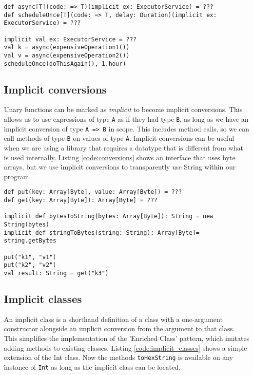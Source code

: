 \begin{lstlisting}[caption=Code with implicits, label=code:with_implicit, float]
def async[T](code: => T)(implicit ex: ExecutorService) = ???
def scheduleOnce[T](code: => T, delay: Duration)(implicit ex: ExecutorService) = ???

implicit val ex: ExecutorService = ???
val k = async(expensiveOperation1())
val v = async(expensiveOperation2())
scheduleOnce(doThisAgain(), 1.hour)
\end{lstlisting}

\subsection{Implicit conversions}
Unary functions can be marked as {\it implicit} to become implicit conversions. This allows us to use expressions of type \texttt{A} as if they had type \texttt{B}, as long as we have an implicit conversion of type \texttt{A => B} in scope. This includes method calls, so we can call methods of type \texttt{B} on values of type \texttt{A}. Implicit conversions can be useful when we are using a library that requires a datatype that is different from what is used internally. Listing \ref{code:conversions} shows an interface that uses byte arrays, but we use implicit conversions to transparently use String within our program.

\begin{lstlisting}[caption=Implicit conversions, label=code:conversions, float]
def put(key: Array[Byte], value: Array[Byte]) = ???
def get(key: Array[Byte]): Array[Byte] = ???

implicit def bytesToString(bytes: Array[Byte]): String = new String(bytes)
implicit def stringToBytes(string: String): Array[Byte]= string.getBytes

put("k1", "v1")
put("k2", "v2")
val result: String = get("k3")
\end{lstlisting}

\subsection{Implicit classes}
An implicit class is a shorthand definition of a class with a one-argument constructor alongside an implicit conversion from the argument to that class. This simplifies the implementation of the 'Enriched Class' pattern, which imitates adding methods to existing classes. Listing \ref{code:implicit_classes} shows a simple extension of the Int class. Now the methods \texttt{toHexString} is available on any instance of \texttt{Int} as long as the implicit class can be located.

